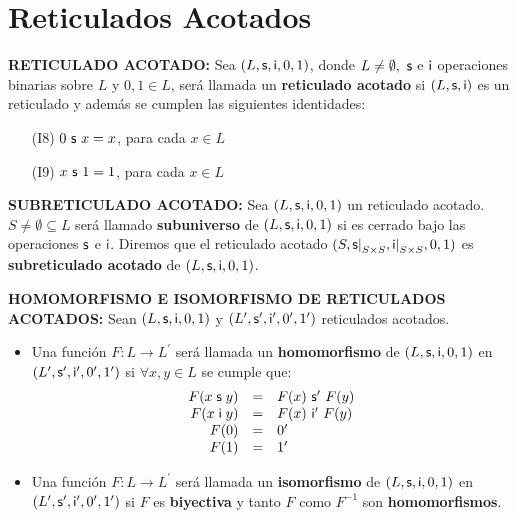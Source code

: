 \section{Reticulados Acotados}

  \PN \textbf{RETICULADO ACOTADO:} Sea $(L, \mathsf{s}, \mathsf{i}, 0, 1)$, donde $L \neq \emptyset, \ \mathsf{s}$ e $\mathsf{i}$ operaciones
  binarias sobre $L$ y $0, 1 \in L$, será llamada un \textbf{reticulado acotado} si $(L, \mathsf{s}, \mathsf{i})$ es un reticulado y
  además se cumplen las siguientes identidades:
  \begin{enumerate}
    \item[(I8)] $0 \ \mathsf{s} \ x = x$, para cada $x \in L$
    \item[(I9)] $x \ \mathsf{s} \ 1 = 1$, para cada $x \in L$
  \end{enumerate}

  \vspace{3mm}
  \PN \textbf{SUBRETICULADO ACOTADO:} Sea $(L, \mathsf{s}, \mathsf{i}, 0, 1)$ un reticulado acotado. $S \neq \emptyset \subseteq L$
  será llamado \textbf{subuniverso} de $(L, \mathsf{s}, \mathsf{i}, 0, 1)$ si es cerrado bajo las operaciones $\mathsf{s}$ e $\mathsf{i}$. Diremos
  que el reticulado acotado $(S, \mathsf{s}\mathrm{\mid}_{S \times S}, \mathsf{i}\mathrm{\mid}_{S \times S}, 0, 1)$ es
  \textbf{subreticulado acotado} de $(L, \mathsf{s}, \mathsf{i}, 0, 1)$.

  \vspace{3mm}
  \PN \textbf{HOMOMORFISMO E ISOMORFISMO DE RETICULADOS ACOTADOS:} Sean $(L, \mathsf{s}, \mathsf{i}, 0, 1)$ y
  $(L^{\prime}, \mathsf{s}^{\prime}, \mathsf{i}^{\prime}, 0^{\prime}, 1^{\prime})$ reticulados acotados.
  \begin{itemize}
    \item Una función $F: L \rightarrow L^{\prime}$ será llamada un \textbf{homomorfismo} de $(L, \mathsf{s}, \mathsf{i}, 0, 1)$ en
      $(L^{\prime}, \mathsf{s}^{\prime}, \mathsf{i}^{\prime}, 0^{\prime}, 1^{\prime})$ si $\forall x, y \in L$ se cumple que:
      \[
        \begin{array}{rcl}
          F(x \mathsf{\;s\;} y) &=& F(x) \ \mathsf{s}^{\prime} \ F(y) \\
          F(x \mathsf{\;i\;} y) &=& F(x) \ \mathsf{i}^{\prime} \ F(y) \\
          F(0) &=& 0^{\prime} \\
          F(1) &=& 1^{\prime}
        \end{array}
      \]
    \item Una función $F: L \rightarrow L^{\prime}$ será llamada un \textbf{isomorfismo} de $(L, \mathsf{s}, \mathsf{i}, 0, 1)$ en
      $(L^{\prime}, \mathsf{s}^{\prime}, \mathsf{i}^{\prime}, 0^{\prime}, 1^{\prime})$ si $F$ es \textbf{biyectiva} y tanto $F$ como
      $F^{-1}$ son \textbf{homomorfismos}.
  \end{itemize}

